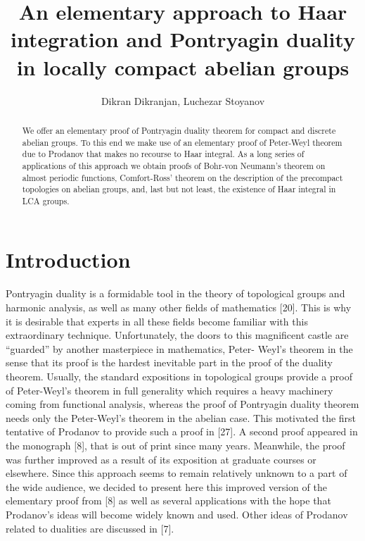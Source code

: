 \documentclass[12pt]{article}
\title{An elementary approach to Haar integration and Pontryagin duality in
locally compact abelian groups}
\author{Dikran Dikranjan,  Luchezar Stoyanov }
\begin{document}
\maketitle

\begin{abstract}
        We offer an elementary proof of Pontryagin duality theorem for compact and discrete
    abelian groups. To this end we make use of an elementary proof of Peter-Weyl theorem
    due to Prodanov that makes no recourse to Haar integral. As a long series of applications
    of this approach we obtain proofs of Bohr-von Neumann's theorem on almost periodic
    functions, Comfort-Ross' theorem on the description of the precompact topologies on
    abelian groups, and, last but not least, the existence of Haar integral in LCA groups.
\end{abstract}

\section{Introduction}


        Pontryagin duality is a formidable tool in the theory of topological groups and harmonic analysis, as well as many other
    fields of mathematics [20]. This is why it is desirable that experts in all these fields become familiar with this extraordinary
    technique. Unfortunately, the doors to this magnificent castle are “guarded” by another masterpiece in mathematics, Peter-
    Weyl’s theorem in the sense that its proof is the hardest inevitable part in the proof of the duality theorem. Usually, the
    standard expositions in topological groups provide a proof of Peter-Weyl's theorem in full generality which requires a heavy
    machinery coming from functional analysis, whereas the proof of Pontryagin duality theorem needs only the Peter-Weyl's
    theorem in the abelian case. This motivated the first tentative of Prodanov to provide such a proof in [27]. A second proof
    appeared in the monograph [8], that is out of print since many years. Meanwhile, the proof was further improved as a result
    of its exposition at graduate courses or elsewhere. Since this approach seems to remain relatively unknown to a part of the
    wide audience, we decided to present here this improved version of the elementary proof from [8] as well as several
    applications with the hope that Prodanov’s ideas will become widely known and used. Other ideas of Prodanov related to
    dualities are discussed in [7].
    
\end{document}
